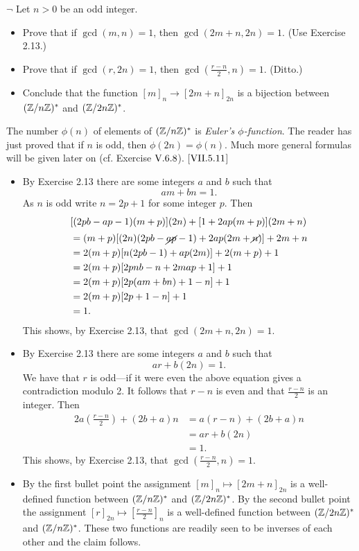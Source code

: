 \begin{exercise}
	$\neg$ Let $n > 0$ be an odd integer.
	\begin{itemize}
		\item Prove that if $\gcd(m,n) = 1$, then $\gcd(2m+n, 2n) = 1$. (Use Exercise 2.13.)
		\item Prove that if $\gcd(r,2n) = 1$, then $\gcd(\frac{r-n}{2}, n ) = 1$. (Ditto.)
		\item Conclude that the function $[m]_n \to [2m + n]_{2n}$ is a bijection between $(\mathbb{Z}/n\mathbb{Z})^*$ and $(\mathbb{Z}/2n\mathbb{Z})^*$.
	\end{itemize}
	The number $\phi(n)$ of elements of $(\mathbb{Z}/n\mathbb{Z})^*$ is \emph{Euler's $\phi$-function}. The reader has just proved that if $n$ is odd, then $\phi(2n) = \phi(n)$. Much more general formulas will be given later on (cf. Exercise $\RNo{5}.6.8$). [$\RNo{7}.5.11$]
\end{exercise}
\begin{solution}\leavevmode
	\begin{itemize}
		\item By Exercise 2.13 there are some integers $a$ and $b$ such that
		\[
			am + bn = 1.
		\]
		As $n$ is odd write $n = 2p + 1$ for some integer $p$. Then
		\begin{align*}
			\intertext{\centering$[(2pb - ap-1)(m+p)](2n) + [1 + 2ap(m+p)](2m + n)$}%
			&= (m+p)[(2n)(2pb - \cancel{ap} -1) + 2ap(2m+\cancel{n})] + 2m + n\\
			&= 2(m+p)[n(2pb - 1) + ap(2m)] + 2(m+p) + 1\\
			&= 2(m+p)[2pnb - n + 2map + 1] + 1\\
			&= 2(m+p)[2p(am + bn) +1 -n ] + 1\\
			&= 2(m+p)[2p + 1 -n] +1\\
			&= 1.
		\end{align*}
		This shows, by Exercise 2.13, that $\gcd(2m + n, 2n) = 1$. 
		\item By Exercise 2.13 there are some integers $a$ and $b$ such that
		\[
			ar + b(2n) = 1.
		\]
		We have that $r$ is odd---if it were even the above equation gives a contradiction modulo 2. It follows that $r-n$ is even and that $\frac{r-n}{2}$ is an integer. Then
		\begin{align*}
			2a\left(\frac{r-n}{2}\right)  + (2b+a)n	&= a(r-n) + (2b + a)n\\
			&= ar + b(2n) \\
			&=1.
		\end{align*}
		This shows, by Exercise 2.13, that $\gcd\left(\frac{r-n}{2}, n\right) = 1$. 
		\item By the first bullet point the assignment $[m]_n \mapsto [2m + n]_{2n}$ is a well-defined function between $(\mathbb{Z}/n\mathbb{Z})^*$ and $(\mathbb{Z}/2n\mathbb{Z})^*$. By the second bullet point the assignment $[r]_{2n} \mapsto \left[\frac{r-n}{2}\right]_n$ is a well-defined function between $(\mathbb{Z}/2n\mathbb{Z})^*$ and $(\mathbb{Z}/n\mathbb{Z})^*$. These two functions are readily seen to be inverses of each other and the claim follows.
	\end{itemize}
\end{solution}

